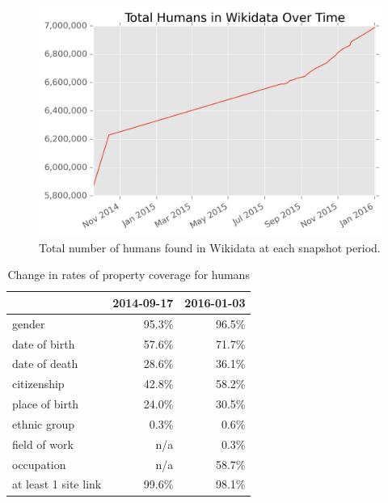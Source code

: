 \documentclass[letterpaper]{article}
\begin{document}
\begin{figure}
\includegraphics[scale=0.6]{figures/totalhumans.png}
\caption{Total number of humans found in Wikidata at each snapshot period.}
\label{fig:totalhumans}
\end{figure}

\begin{table}
\caption{Change in rates of property coverage for humans}
\begin{tabular}{lrr}
\toprule
{} &  2014-09-17 &  2016-01-03 \\
\midrule
gender               &       95.3\% &       96.5\% \\
date of birth        &       57.6\% &       71.7\% \\
date of death        &       28.6\% &       36.1\% \\
citizenship          &       42.8\% &       58.2\% \\
place of birth       &       24.0\% &       30.5\% \\
ethnic group         &        0.3\% &        0.6\% \\
field of work        &        n/a &        0.3\% \\
occupation           &        n/a &       58.7\% \\
at least 1 site link &       99.6\% &       98.1\% \\
\bottomrule
\end{tabular}
\label{table:accompanying}
\end{table}
\end{document}
